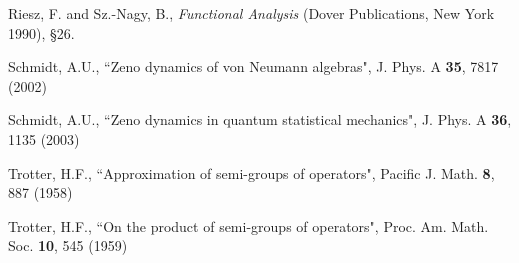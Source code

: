 \documentclass[aip,jmp
]{revtex4}
\theoremstyle{definition}
\begin{document}
\begin{thebibliography}{20}
Riesz, F. and  Sz.-Nagy, B.,
\textit{Functional Analysis} (Dover Publications, New York 1990), \S 26.


Schmidt, A.U.,
{``Zeno dynamics of von Neumann algebras"},
J. Phys. A {\bf 35}, 7817 (2002)


Schmidt, A.U.,
{``Zeno dynamics in quantum statistical mechanics"},
J. Phys. A {\bf 36}, 1135 (2003)

Trotter, H.F.,
{``Approximation of semi-groups of operators"},
Pacific J. Math.  \textbf{8}, 887  (1958)

Trotter, H.F.,
{``On the product of semi-groups of operators"},
Proc. Am. Math. Soc. \textbf{10}, 545 (1959)



\end{thebibliography}
\end{document}
